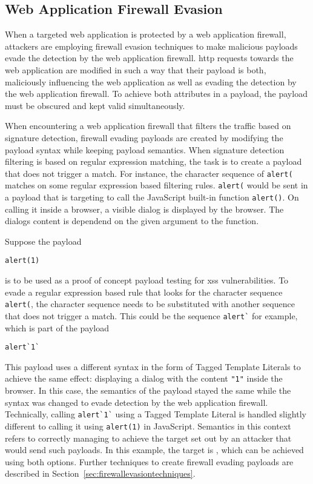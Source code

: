 \subsection{Web Application Firewall Evasion}
When a targeted web application is protected by a web application firewall, attackers are employing firewall evasion techniques to make malicious payloads evade the detection by the web application firewall.
\acrshort{http} requests towards the web application are modified in such a way that their payload is both, maliciously influencing the web application as well as evading the detection by the web application firewall. To achieve both attributes in a payload, the payload must be obscured and kept valid simultaneously. 

When encountering a web application firewall that filters the traffic based on signature detection, firewall evading payloads are created by modifying the payload syntax while keeping payload semantics.
When signature detection filtering is based on regular expression matching, the task is to create a payload that does not trigger a match.
For instance, the character sequence of \verb|alert(| matches on some regular expression based filtering rules. \verb|alert(| would be sent in a payload that is targeting to call the JavaScript built-in function \verb|alert()|. On calling it inside a browser, a visible dialog is displayed by the browser. The dialogs content is dependend on the given argument to the function. \cite{js/alert}

Suppose the payload 

\begin{lstlisting}[style=basicStyle]
alert(1)
\end{lstlisting}

is to be used as a proof of concept payload testing for \acrshort{xss} vulnerabilities.
To evade a regular expression based rule that looks for the character sequence \verb|alert(|, the character sequence needs to be substituted with another sequence that does not trigger a match. 
This could be the sequence \verb|alert`| for example, which is part of the payload 

\begin{lstlisting}[style=basicStyle]
alert`1`
\end{lstlisting}

This payload uses a different syntax in the form of Tagged Template Literals to achieve the same effect: displaying a dialog with the content \verb|"1"| inside the browser.
In this case, the semantics of the payload stayed the same while the syntax was changed to evade detection by the web application firewall. 
Technically, calling \verb|alert`1`| using a Tagged Template Literal is handled slightly different to calling it using \verb|alert(1)| in JavaScript. Semantics in this context refers to correctly managing to achieve the target set out by an attacker that would send such payloads. In this example, the target is , which can be achieved using both options.
Further techniques to create firewall evading payloads are described in Section~\ref{sec:firewallevasiontechniques}.

